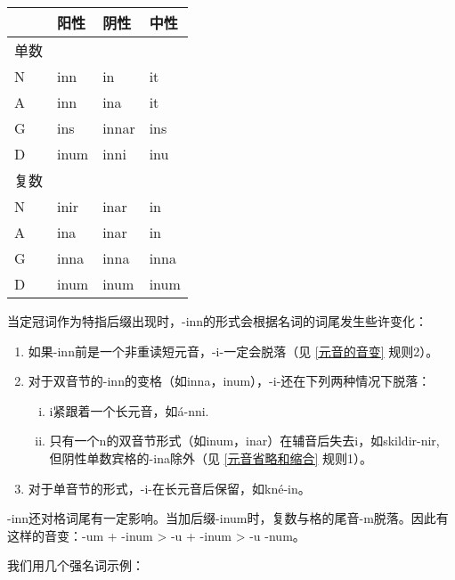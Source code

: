 \begin{longtable}{llll}
  \toprule
     & \textbf{阳性} & \textbf{阴性} & \textbf{中性} \\
  \midrule
  \endhead
  \bottomrule
  \endfoot
  单数 &             &             &             \\
  N  & inn         & in          & it          \\
  A  & inn         & ina         & it          \\
  G  & ins         & innar       & ins         \\
  D  & inum        & inni        & inu         \\
  复数 &             &             &             \\
  N  & inir        & inar        & in          \\
  A  & ina         & inar        & in          \\
  G  & inna        & inna        & inna        \\
  D  & inum        & inum        & inum        \\
\end{longtable}

当定冠词作为特指后缀出现时，-inn的形式会根据名词的词尾发生些许变化：

\begin{info}
  \begin{enumerate}
    \item  如果-inn前是一个非重读短元音，-i-一定会脱落（见 \ref{元音的音变} 规则2）。
    \item  对于双音节的-inn的变格（如inna，inum），-i-还在下列两种情况下脱落：
          \begin{enumerate}[i.]
            \item  i紧跟着一个长元音，如á-nni.
            \item  只有一个n的双音节形式（如inum，inar）在辅音后失去i，如skildir-nir,    但阴性单数宾格的-ina除外（见 \ref{元音省略和缩合} 规则1）。
          \end{enumerate}
    \item  对于单音节的形式，-i-在长元音后保留，如kné-in。
  \end{enumerate}
\end{info}

-inn还对格词尾有一定影响。当加后缀-inum时，复数与格的尾音-m脱落。因此有这样的音变：-um
+ -inum > -u + -inum > -u -num。

我们用几个强名词示例：

